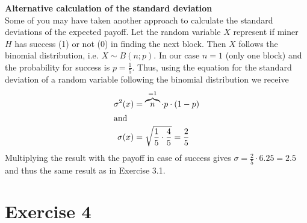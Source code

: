 \documentclass[12pt]{article}
\begin{document}
	\vspace{0.75cm}
	\textbf{Alternative calculation of the standard deviation}\\
	Some of you may have taken another approach to calculate the standard deviations of the expected payoff. Let the random variable $X$ represent if miner $H$ has success (1) or not (0) in finding the next block. Then $X$ follows the binomial distribution, i.e. $X \sim B(n;p)$. In our case $n = 1$ (only one block) and the probability for success is $p=\frac{1}{5}$. Thus, using the equation for the standard deviation of a random variable following the binomial distribution we receive
	\begin{align*}
		\sigma^{2}(x) &= \overbrace{n}^{=1} \cdot p \cdot (1-p)\\
		\intertext{and}
		\sigma(x) &= \sqrt{\frac{1}{5} \cdot \frac{4}{5}} = \frac{2}{5}
	\end{align*}
	Multiplying the result with the payoff in case of success gives $\sigma = \frac{2}{5} \cdot 6.25 = 2.5$ and thus the same result as in Exercise 3.1.
	
	\newpage
	\section*{Exercise 4}
\end{document}
